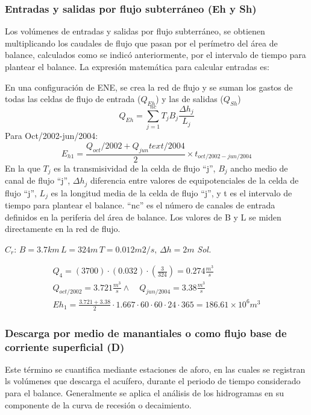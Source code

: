 \subsubsection{Entradas y salidas por flujo subterráneo (Eh y Sh)}
Los volúmenes de entradas y salidas por flujo subterráneo, se obtienen multiplicando los caudales de flujo que pasan por el perímetro del área de balance, calculados como se indicó anteriormente, por el intervalo de tiempo para plantear el balance. La expresión matemática para calcular entradas es:

En una configuración de ENE, se crea la red de flujo y se suman los gastos de todas las celdas de flujo de entrada ($Q_{Eh}$) y las de salidas ($Q_{Sh}$)
\begin{equation}
    Q_{Eh}= \sum_{j = 1}^{nc}T_jB_j\frac{\Delta h_j}{L_j}
\end{equation}
Para Oct/2002-jun/2004: 
\begin{equation*}
    E_{h1} = \frac{Q_{oct}\text{/2002} +Q_{jun}text{/2004}}{2} \times t_{oct\text{/2002} - jun\text{/2004}} 
\end{equation*}
En la que $T_j$ es la transmisividad de la celda de flujo ``j'', $B_j$ ancho medio de canal de flujo ``j'', $\Delta h_j$ diferencia entre valores de equipotenciales de la celda de flujo ``j'', $L_j$ es la longitud media de la celda de flujo ``j'', y t es el intervalo de tiempo para plantear el balance. ``nc'' es el número de canales de entrada definidos en la periferia del área de balance. Los valores de B y L se miden directamente en la red de flujo.
\begin{example}
    $C_r: \, B=3.7km\, L=324m\, T=0.012m2/s,\,\Delta h=2m$
    \textit{ Sol. }

    \begin{align*}
        Q_4 =\left(3700\right) \cdot \left(0.032\right) \cdot \left(\frac{3}{324}\right)= 0.274 \frac{m^3}{s}\\
        Q_{oct /2002} = 3.721 \frac{m^3}{s}\land\quad Q_{jun / 2004}= 3.38 \frac{m^3}{s}\\
        Eh_1 = \frac{3.721 + 3.38}{2} \cdot 1.667 \cdot 60 \cdot 60 \cdot 24 \cdot 365 = 186.61 \times 10^6 m^3
    \end{align*}
\end{example}
\subsubsection{Descarga por medio de manantiales o como flujo base de corriente superficial (D)}
Este término se cuantifica mediante estaciones de aforo, en las cuales se registran ls volúmenes que descarga el acuífero, durante el periodo de tiempo considerado para el balance. Generalmente se aplica el análisis de los hidrogramas en su componente de la curva de recesión o decaimiento.

